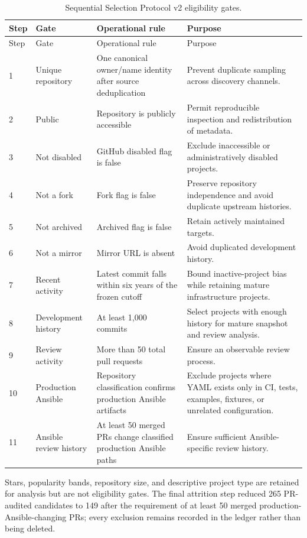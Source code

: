 \begin{longtable}{@{}p{0.8cm}p{4.0cm}p{4.8cm}p{4.0cm}@{}}
\caption{Sequential Selection Protocol v2 eligibility gates.}
\label{tab:corpus_gates}\\
\toprule Step & Gate & Operational rule & Purpose \\
\midrule\endfirsthead
\toprule Step & Gate & Operational rule & Purpose \\
\midrule\endhead
1 & Unique repository & One canonical owner/name identity after source
deduplication & Prevent duplicate sampling across discovery channels. \\
2 & Public & Repository is publicly accessible & Permit reproducible inspection
and redistribution of metadata. \\
3 & Not disabled & GitHub disabled flag is false & Exclude inaccessible or
administratively disabled projects. \\
4 & Not a fork & Fork flag is false & Preserve repository independence and
avoid duplicate upstream histories. \\
5 & Not archived & Archived flag is false & Retain actively maintained targets. \\
6 & Not a mirror & Mirror URL is absent & Avoid duplicated development history. \\
7 & Recent activity & Latest commit falls within six years of the frozen cutoff
& Bound inactive-project bias while retaining mature infrastructure projects. \\
8 & Development history & At least 1,000 commits & Select projects with enough
history for mature snapshot and review analysis. \\
9 & Review activity & More than 50 total pull requests & Ensure an observable
review process. \\
10 & Production Ansible & Repository classification confirms production
Ansible artifacts & Exclude projects where YAML exists only in CI, tests,
examples, fixtures, or unrelated configuration. \\
11 & Ansible review history & At least 50 merged PRs change classified
production Ansible paths & Ensure sufficient Ansible-specific review history. \\
\bottomrule
\end{longtable}

Stars, popularity bands, repository size, and descriptive project type are
retained for analysis but are not eligibility gates. The final attrition step
reduced 265 PR-audited candidates to 149 after the requirement of at least 50
merged production-Ansible-changing PRs; every exclusion remains recorded in
the ledger rather than being deleted.

